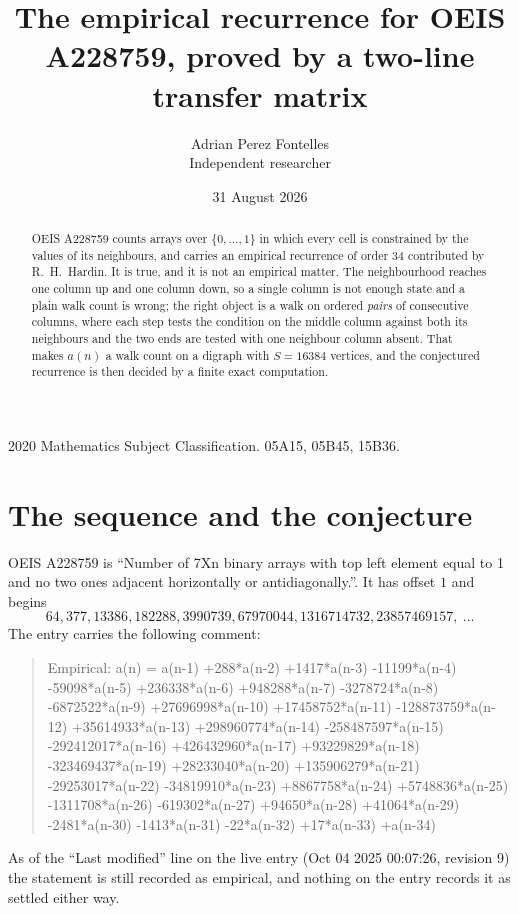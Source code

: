 \documentclass[11pt,a4paper]{article}
\title{The empirical recurrence for OEIS A228759, proved by a two-line transfer matrix}
\author{Adrian Perez Fontelles\\ \small Independent researcher}
\date{31 August 2026}
\theoremstyle{plain}
\theoremstyle{definition}
\begin{document}
\maketitle

\begin{abstract}
OEIS A228759 counts arrays over $\{0,\dots,1\}$ in which every cell is constrained by the
values of its neighbours, and carries an empirical recurrence of order $34$ contributed
by R.~H.~Hardin. It is true, and it is not an empirical matter. The neighbourhood reaches one
column up and one column down, so a single column is not enough state and a plain walk count
is wrong; the right object is a walk on ordered \emph{pairs} of consecutive columns, where
each step tests the condition on the middle column against both its neighbours and the two
ends are tested with one neighbour column absent. That makes $a(n)$ a walk count on a digraph
with $S=16384$ vertices, and the conjectured recurrence is then decided by a finite exact
computation.
\end{abstract}

\noindent\small 2020 Mathematics Subject Classification. 05A15, 05B45, 15B36.\normalsize

\section{The sequence and the conjecture}

OEIS A228759 is ``Number of 7Xn binary arrays with top left element equal to 1 and no two ones adjacent horizontally or antidiagonally.''. It has offset $1$ and begins
\[
64, 377, 13386, 182288, 3990739, 67970044, 1316714732, 23857469157,\ \dots
\]
The entry carries the following comment:
\begin{quote}\small
Empirical: a(n) = a(n-1) +288*a(n-2) +1417*a(n-3) -11199*a(n-4) -59098*a(n-5) +236338*a(n-6) +948288*a(n-7) -3278724*a(n-8) -6872522*a(n-9) +27696998*a(n-10) +17458752*a(n-11) -128873759*a(n-12) +35614933*a(n-13) +298960774*a(n-14) -258487597*a(n-15) -292412017*a(n-16) +426432960*a(n-17) +93229829*a(n-18) -323469437*a(n-19) +28233040*a(n-20) +135906279*a(n-21) -29253017*a(n-22) -34819910*a(n-23) +8867758*a(n-24) +5748836*a(n-25) -1311708*a(n-26) -619302*a(n-27) +94650*a(n-28) +41064*a(n-29) -2481*a(n-30) -1413*a(n-31) -22*a(n-32) +17*a(n-33) +a(n-34)
\end{quote}
As of the ``Last modified'' line on the live entry (Oct 04 2025 00:07:26, revision 9) the statement is
still recorded as empirical, and nothing on the entry records it as settled either way.
\end{document}
